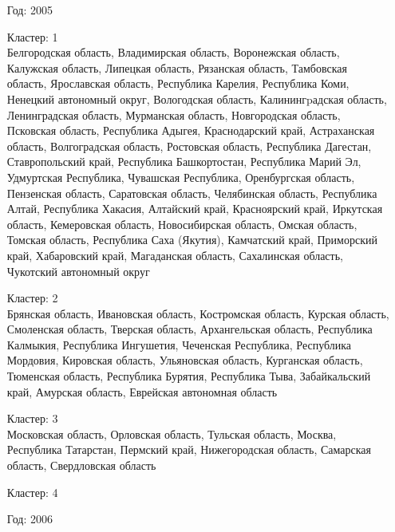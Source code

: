 \documentclass[11pt]{article}
\begin{document}
\begin{itemize}
    \item[Год:  2005]

  Кластер:  1 \\
 Белгородская область, Владимирская область, Воронежская область, Калужская область, Липецкая область, Рязанская область, Тамбовская область, Ярославская область, Республика Карелия, Республика Коми, Ненецкий автономный округ, Вологодская область, Калинингpадская область, Ленинградская область, Мурманская область, Новгородская область, Псковская область, Республика Адыгея, Краснодарский край, Астраханская область, Волгоградская область, Ростовская область, Республика Дагестан, Ставропольский край, Республика Башкортостан, Республика Марий Эл, Удмуртская Республика, Чувашская Республика, Оренбургская область, Пензенская область, Саратовская область, Челябинская область, Республика Алтай, Республика Хакасия, Алтайский край, Красноярский край, Иркутская область, Кемеровская область, Новосибирская область, Омская область, Томская область, Республика Саха (Якутия), Камчатский край, Приморский край, Хабаровский край, Магаданская область, Сахалинская область, Чукотский автономный округ

  Кластер:  2 \\
 Брянская область, Ивановская область, Костромская область, Курская область, Смоленская область, Тверская область, Архангельская область, Республика Калмыкия, Республика Ингушетия, Чеченская Республика, Республика Мордовия, Кировская область, Ульяновская область, Курганская область, Тюменская область, Республика Бурятия, Республика Тыва, Забайкальский край, Амурская область, Еврейская автономная область

  Кластер:  3 \\
 Московская область, Орловская область, Тульская область, Москва, Республика Татарстан, Пермский край, Нижегородская область, Самарская область, Свердловская область

  Кластер:  4 \\



  \item[Год:  2006]


\end{itemize}
\end{document}
